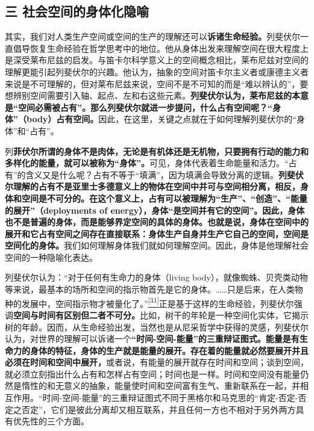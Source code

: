 \documentclass[UTF8, fontset = sourcesans, a4paper, oneside, zihao =
-4, scheme=chinese, no-math, space=true]{ctexbook}
\begin{document}
\subsection{三
社会空间的身体化隐喻}\label{part0006_split_002.htmlux5cux23c018}

其实，我们对人类生产空间或空间的生产的理解还可以\textbf{诉诸生命经验。}列斐伏尔一直倡导恢复生命经验在哲学思考中的地位。他从身体出发来理解空间在很大程度上是深受莱布尼兹的启发。与笛卡尔科学意义上的空间概念相比，莱布尼兹对空间的理解更能引起列斐伏尔的兴趣。他认为，抽象的空间对笛卡尔主义者或康德主义者来说是不可理解的，但对莱布尼兹来说，空间不是不可知的而是``难以辨认的''，要想辨别空间需要引入轴、起点、左和右这些元素。\textbf{列斐伏尔认为，莱布尼兹的本意是``空间必需被占有''。那么列斐伏尔就进一步提问，什么占有空间呢？``身体''（body）占有空间。}因此，在这里，关键之点就在于如何理解列斐伏尔的``身体''和``占有''。

列\textbf{菲伏尔所谓的身体不是肉体，无论是有机体还是无机物，只要拥有行动的能力和多样化的能量，就可以被称为``身体''。}可见，身体代表着生命能量和活力。``占有''的含义又是什么呢？占有不等于``填满''，因为填满会导致分离的逻辑。\textbf{列斐伏尔理解的占有不是亚里士多德意义上的物体在空间中并可与空间相分离，相反，身体和空间是不可分的。在这个意义上，占有可以被理解为``生产''、``创造''、``能量的展开''（deployments
of
energy），身体``是空间并有它的空间''。因此，身体也不是普遍的身体，而是能够界定空间的具体的身体。也就是说，身体在空间中的展开和它占有空间之间存在直接联系：身体生产自身并生产它自己的空间，空间是空间化的身体。}我们如何理解身体我们就如何理解空间。因此，身体是他理解社会空间的一种隐喻化表达。

列斐伏尔认为：``对于任何有生命力的身体（living
body），就像蜘蛛、贝壳类动物等来说，最基本的场所和空间的指示物首先是它的身体。……只是后来，在人类物种的发展中，空间指示物才被量化了。''\protect\hypertarget{part0006_split_002.htmlux5cux23w31}{}{}\protect\hyperlink{part0006_split_003.htmlux5cux23m31}{\textsuperscript{{[}31{]}}}正是基于这样的生命经验，列斐伏尔强调\textbf{空间与时间有区别但二者不可分。}比如，树干的年轮是一种空间化实体，它揭示树的年龄。因而，从生命经验出发，当然也是从尼采哲学中获得的灵感，列斐伏尔认为，对世界的理解可以诉诸一个\textbf{``时间-空间-能量''的三重辩证图式。能量是有生命力的身体的特征，身体的生产就是能量的展开。存在着的能量就必然要展开并且必须在时间和空间中展开，}或者说，有能量的展开就存在时间和空间；谈到空间，就必须立刻指出什么占有和怎样占有空间；时间也是一样。时间和空间没有能量仍然是惰性的和无意义的抽象，能量使时间和空间富有生气、重新联系在一起，并相互作用。``时间-空间-能量''的三重辩证图式不同于黑格尔和马克思的``肯定-否定-否定之否定''，它们是彼此分离却又相互联系，并且任何一方也不相对于另外两方具有优先性的三个方面。
\end{document}
